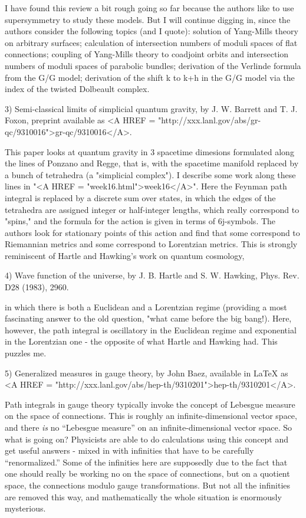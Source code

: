 I have found this review a bit rough going so far because the authors
like to use supersymmetry to study these models.  But I will continue
digging in, since the authors consider the following topics (and I
quote): solution of Yang-Mills theory on arbitrary surfaces; calculation
of intersection numbers of moduli spaces of flat connections; coupling
of Yang-Mills theory to coadjoint orbits and intersection numbers of
moduli spaces of parabolic bundles; derivation of the Verlinde formula
from the G/G model; derivation of the shift k to k+h in the G/G model
via the index of the twisted Dolbeault complex.

3) Semi-classical limits of simplicial quantum gravity, by J. W. Barrett
and T. J. Foxon, preprint available as <A HREF = "http://xxx.lanl.gov/abs/gr-qc/9310016">gr-qc/9310016</A>.

This paper looks at quantum gravity in 3 spacetime dimesions formulated
along the lines of Ponzano and Regge, that is, with the spacetime
manifold replaced by a bunch of tetrahedra (a "simplicial complex").  
I describe some work along these lines in "<A HREF = "week16.html">week16</A>".  Here the Feynman
path integral is replaced by a discrete sum over states, in which the
edges of the tetrahedra are assigned integer or half-integer lengths,
which really correspond to "spins," and the formula for the action is
given in terms of 6j-symbols.  The authors look for stationary points of
this action and find that some correspond to Riemannian metrics and some
correspond to Lorentzian metrics.  This is strongly reminiscent of
Hartle and Hawking's work on quantum cosmology,

4) Wave function of the universe, by J. B. Hartle and S. W. Hawking,
Phys. Rev. D28 (1983), 2960.

in which there is both a Euclidean and a Lorentzian regime (providing a
most fascinating answer to the old question, "what came before the big
bang!).  Here, however, the path integral is oscillatory in the
Euclidean regime and exponential in the Lorentzian one - the opposite of
what Hartle and Hawking had.  This puzzles me.

5) Generalized measures in gauge theory, by John Baez, available in
LaTeX as <A HREF = "http://xxx.lanl.gov/abs/hep-th/9310201">hep-th/9310201</A>.

Path integrals in gauge theory typically invoke the concept of Lebesgue
measure on the space of connections.  This is roughly an
infinite-dimensional vector space, and there \emph{is} no ``Lebesgue
measure'' on an infinite-dimensional vector space.  So what is going on?
Physicists are able to do calculations using this concept and get useful
answers - mixed in with infinities that have to be carefully
``renormalized.''  Some of the infinities here are supposedly due to the
fact that one should really be working no on the space of connections,
but on a quotient space, the connections modulo gauge transformations.
But not all the infinities are removed this way, and mathematically the
whole situation is enormously mysterious.

